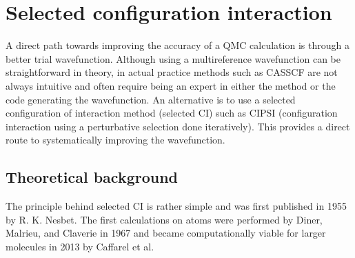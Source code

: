\chapter{Selected configuration interaction}
\label{chap:sCI}
A direct path towards improving the accuracy of a QMC calculation is
through a better trial wavefunction.  Although using a multireference
wavefunction can be straightforward in theory, in actual practice
methods such as CASSCF are not always intuitive and often require
being an expert in either the method or the code generating the
wavefunction.  An alternative is to use a selected configuration of
interaction method (selected CI) such as CIPSI (configuration
interaction using a perturbative selection done iteratively). This
provides a direct route to systematically improving the wavefunction.

\section{Theoretical background}

The principle behind selected CI is rather simple and was first published in 1955 by R. K. Nesbet\cite{Nesbet1955}.
The first calculations on atoms were performed by Diner, Malrieu, and Claverie\cite{Diner1967} in 1967 and became computationally viable for larger molecules in 2013 by Caffarel et al.\cite{Caffarel2013}  

